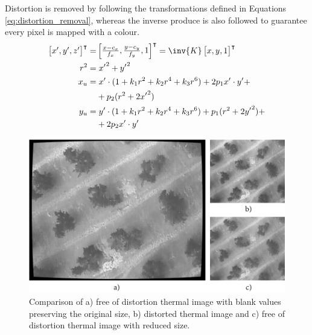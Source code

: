 Distortion is removed by following the transformations defined in Equations \ref{eq:distortion_removal}, whereas the inverse produce is also followed to guarantee every pixel is mapped with a colour.
\begin{gather}
    \label{eq:distortion_removal}
    \begin{aligned}
    \begin{bmatrix} 
        x', y', z'
    \end{bmatrix}^\intercal 
    =& 
    \begin{bmatrix}
        \frac{x - c_x}{f_x}, \frac{y - c_y}{f_y}, 1
    \end{bmatrix}^\intercal
    = 
    \inv{K} \begin{bmatrix}
        x, y, 1
    \end{bmatrix}^\intercal\\
    r^2 =& \hspace{1mm} {x'}^2 + {y'}^2\\
    x_u =& \hspace{1mm} x' \cdot (1 + k_1r^2 + k_2r^4 + k_3r^6) + 2p_1{x'} \cdot {y'}+\\&+ p_2(r^2 + 2{x'}^2)\\
    y_u =& \hspace{1mm} y' \cdot (1 + k_1r^2 + k_2r^4 + k_3r^6) + p_1(r^2 + 2{y'}^2) +\\&+2p_2{x'} \cdot {y'}
    \end{aligned}
\end{gather}

\begin{figure}[hbt]
	\centering
	\includegraphics{figs/materials/thermal_distortion_2.png}
	\caption{Comparison of a) free of distortion thermal image with blank values preserving the original size, b) distorted thermal image and c) free of distortion thermal image with reduced size.}
	\label{fig:thermal_undistortion}
\end{figure}


